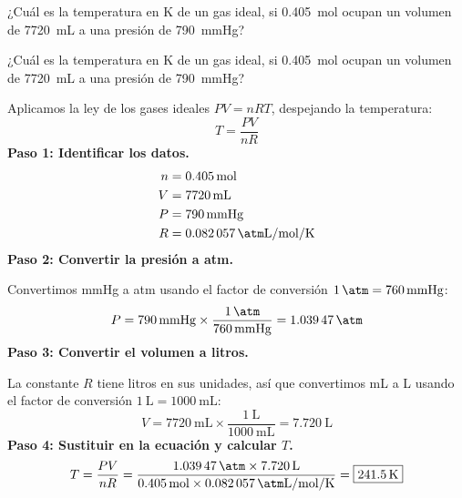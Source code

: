 \begin{exercise}
    ¿Cuál es la temperatura en \unit{\kelvin} de un gas ideal, si \qty{0.405}{\mole} ocupan un volumen de \qty{7720}{\mL} a una presión de \qty{790}{\mmHg}?
    \begin{solu}
        ¿Cuál es la temperatura en \unit{\kelvin} de un gas ideal, si \qty{0.405}{\mole} ocupan un volumen de \qty{7720}{\mL} a una presión de \qty{790}{\mmHg}?

        Aplicamos la ley de los gases ideales $PV = nRT$, despejando la temperatura:
        \begin{equation*}
            T = \frac{PV}{nR}
        \end{equation*}
        \textbf{Paso 1: Identificar los datos.}
        \begin{align*}
            n &= \qty{0.405}{\mol} \\
            V &= \qty{7720}{\mL} \\
            P &= \qty{790}{\mmHg} \\
            R &= \qty{0.082057}{\atm\liter\per\mol\per\kelvin}
        \end{align*}
        \textbf{Paso 2: Convertir la presión a atm.}

        Convertimos mmHg a atm usando el factor de conversión $\qty{1}{\atm} = \qty{760}{\mmHg}$:
        \begin{equation*}
            P = \qty{790}{\mmHg} \times \frac{\qty{1}{\atm}}{\qty{760}{\mmHg}} = \qty{1.03947}{\atm}
        \end{equation*}
        \textbf{Paso 3: Convertir el volumen a litros.}

        La constante $R$ tiene litros en sus unidades, así que convertimos mL a L usando el factor de conversión $\qty{1}{\liter} = \qty{1000}{\mL}$:
        \begin{equation*}
            V = \qty{7720}{\mL} \times \frac{\qty{1}{\liter}}{\qty{1000}{\mL}} = \qty{7.720}{\liter}
        \end{equation*}
        \textbf{Paso 4: Sustituir en la ecuación y calcular $T$.}
        \begin{equation*}
            T = \frac{PV}{nR} = \frac{\qty{1.03947}{\atm} \times \qty{7.720}{\liter}}{\qty{0.405}{\mol} \times \qty{0.082057}{\atm\liter\per\mol\per\kelvin}} = \boxed{\qty{241.5}{\kelvin}}
        \end{equation*}
    \end{solu}
\end{exercise}
